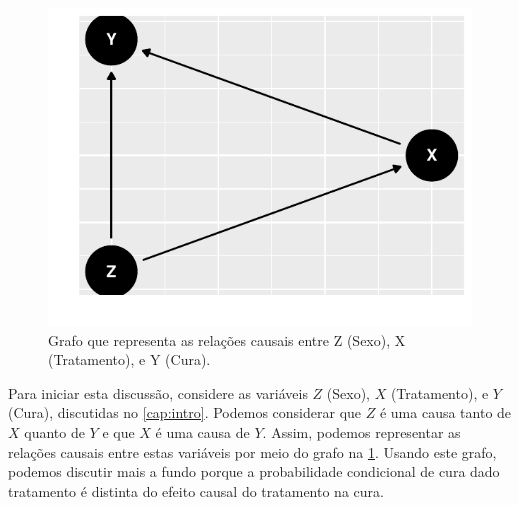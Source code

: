 \begin{knitrout}
\color{fgcolor}\begin{figure}

{\centering \includegraphics[width=\maxwidth]{./figures/simpson_sexo-1} 

}

\caption[Grafo que representa as relações causais entre Z (Sexo), X (Tratamento), e Y (Cura)]{Grafo que representa as relações causais entre Z (Sexo), X (Tratamento), e Y (Cura).}\label{fig:simpson_sexo}
\end{figure}

\end{knitrout}

Para iniciar esta discussão, considere
as variáveis $Z$ (Sexo), $X$ (Tratamento), 
e $Y$ (Cura), discutidas no \cref{cap:intro}.
Podemos considerar que $Z$ é uma causa
tanto de $X$ quanto de $Y$ e que
$X$ é uma causa de $Y$. Assim,
podemos representar as relações causais 
entre estas variáveis por meio do grafo
na \cref{fig:simpson_sexo}.
Usando este grafo, podemos 
discutir mais a fundo porque 
a probabilidade condicional de cura dado tratamento é
distinta do efeito causal do tratamento na cura.

